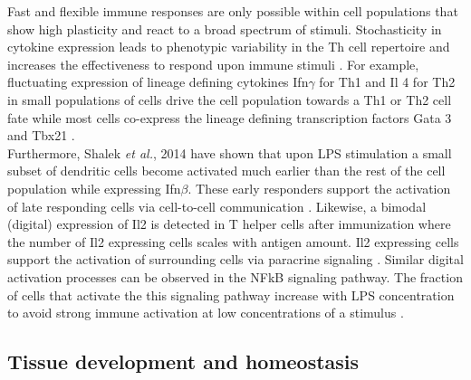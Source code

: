 Fast and flexible immune responses are only possible within cell populations that show high plasticity and react to a broad spectrum of stimuli. Stochasticity in cytokine expression leads to phenotypic variability in the \Gls{Th} cell repertoire and increases the effectiveness to respond upon immune stimuli \citep{Schrom2017}. For example, fluctuating expression of lineage defining cytokines \Gls{Ifn}$\gamma$ for Th1 and \Gls{Il} 4 for Th2 in small populations of cells drive the cell population towards a Th1 or Th2 cell fate while most cells co-express the lineage defining transcription factors \Gls{Gata} 3 and \Gls{Tbx21} \citep{Fang2013a, Antebi2013}.\\

Furthermore, Shalek \textit{et al.}, 2014 have shown that upon \Gls{LPS} stimulation a small subset of dendritic cells become activated much earlier than the rest of the cell population while expressing Ifn$\beta$. These early responders support the activation of late responding cells via cell-to-cell communication \citep{Shalek2014}. Likewise, a bimodal (digital) expression of Il2 is detected in T helper cells after immunization where the number of Il2 expressing cells scales with antigen amount. Il2 expressing cells support the activation of surrounding cells via paracrine signaling \citep{Fuhrmann2016}. Similar digital activation processes can be observed in the \Gls{NFkB} signaling pathway. The fraction of cells that activate the this signaling pathway increase with LPS concentration to avoid strong immune activation at low concentrations of a stimulus \citep{Kellogg2015b}.

\subsection{Tissue development and homeostasis}

